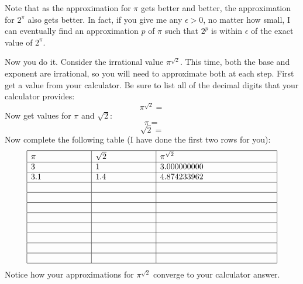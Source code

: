 \documentclass[letterpaper,12pt,fleqn]{article}
\begin{document}
Note that as the approximation for $\pi$ gets better and better, the
approximation for $2^\pi$ also gets better. In fact, if you give me any
$\epsilon>0$, no matter how small, I can eventually find an approximation $p$
of $\pi$ such that $2^p$ is within $\epsilon$ of the exact value of $2^\pi$.

Now you do it. Consider the irrational value $\pi^{\sqrt{2}}$. This time, both
the base and exponent are irrational, so you will need to approximate both at
each step. First get a value from your calculator. Be sure to list all of the
decimal digits that your calculator provides:
\[\pi^{\sqrt{2}}=\]
Now get values for $\pi$ and $\sqrt{2}$:
\[\pi=\]
\[\sqrt{2}=\]
Now complete the following table (I have done the first two rows for you):
\[\begin{array}{|l|l|l|}
  \hline
  \pi & \sqrt{2} & \pi^{\sqrt{2}} \\
  \hline
  3 & 1 & 3.000000000 \\
  \hline
  3.1 & 1.4 & 4.874233962 \\
  \hline
  \hspace{16ex} & \hspace{16ex} & \hspace{32ex} \\
  \hline
  & & \\
  \hline
  & & \\
  \hline
  & & \\
  \hline
  & & \\
  \hline
  & & \\
  \hline
  & & \\
  \hline
  & & \\
  \hline
\end{array}\]
Notice how your approximations for $\pi^{\sqrt{2}}$ converge to your
calculator answer.
\end{document}
